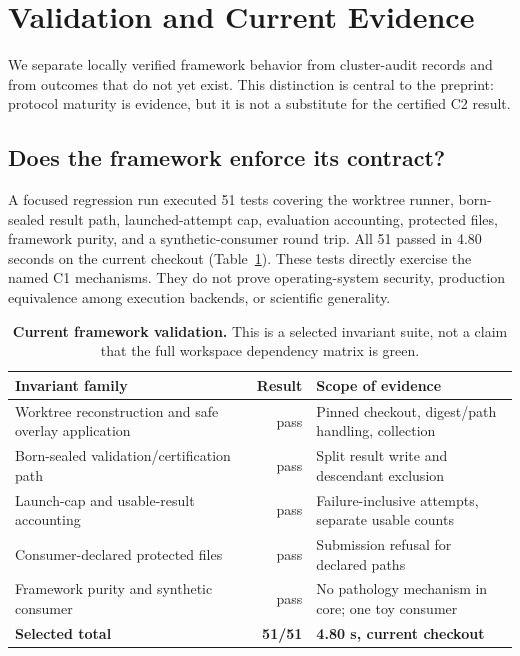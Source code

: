 \documentclass{article}
\begin{document}
\section{Validation and Current Evidence}
\label{sec:validation}

We separate locally verified framework behavior from cluster-audit records and
from outcomes that do not yet exist.  This distinction is central to the
preprint: protocol maturity is evidence, but it is not a substitute for the
certified C2 result.

\subsection{Does the framework enforce its contract?}

A focused regression run executed 51 tests covering the worktree runner,
born-sealed result path, launched-attempt cap, evaluation accounting, protected
files, framework purity, and a synthetic-consumer round trip.  All 51 passed in
4.80 seconds on the current checkout (Table~\ref{tab:validation}).  These tests
directly exercise the named C1 mechanisms.  They do not prove operating-system
security, production equivalence among execution backends, or scientific
generality.

\begin{table}[t]
\centering
\caption{\textbf{Current framework validation.}  This is a selected invariant
suite, not a claim that the full workspace dependency matrix is green.}
\label{tab:validation}
\small
\begin{tabularx}{\linewidth}{XrX}
\toprule
Invariant family & Result & Scope of evidence \\
\midrule
Worktree reconstruction and safe overlay application & pass &
Pinned checkout, digest/path handling, collection \\
Born-sealed validation/certification path & pass &
Split result write and descendant exclusion \\
Launch-cap and usable-result accounting & pass &
Failure-inclusive attempts, separate usable counts \\
Consumer-declared protected files & pass &
Submission refusal for declared paths \\
Framework purity and synthetic consumer & pass &
No pathology mechanism in core; one toy consumer \\
\midrule
\textbf{Selected total} & \textbf{51/51} & \textbf{4.80 s, current checkout} \\
\bottomrule
\end{tabularx}
\end{table}
\end{document}
